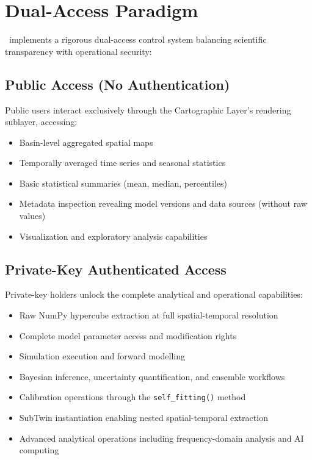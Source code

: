 \section{Dual-Access Paradigm}

\hydrot\ implements a rigorous dual-access control system balancing scientific transparency with operational security:

\subsection{Public Access (No Authentication)}

Public users interact exclusively through the Cartographic Layer's rendering sublayer, accessing:
\begin{itemize}
\item Basin-level aggregated spatial maps
\item Temporally averaged time series and seasonal statistics
\item Basic statistical summaries (mean, median, percentiles)
\item Metadata inspection revealing model versions and data sources (without raw values)
\item Visualization and exploratory analysis capabilities
\end{itemize}

\subsection{Private-Key Authenticated Access}

Private-key holders unlock the complete analytical and operational capabilities:
\begin{itemize}
\item Raw NumPy hypercube extraction at full spatial-temporal resolution
\item Complete model parameter access and modification rights
\item Simulation execution and forward modelling
\item Bayesian inference, uncertainty quantification, and ensemble workflows
\item Calibration operations through the \texttt{self\_fitting()} method
\item SubTwin instantiation enabling nested spatial-temporal extraction
\item Advanced analytical operations including frequency-domain analysis and AI computing
\end{itemize}

